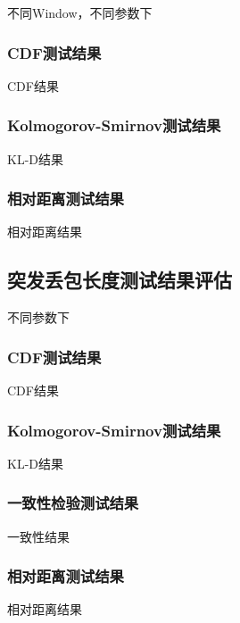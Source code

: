 不同Window，不同参数下

\subsubsection{CDF测试结果}
\label{chap:analyze:result:window:cdf}

CDF结果

\subsubsection{Kolmogorov-Smirnov测试结果}
\label{chap:analyze:result:window:kld}

KL-D结果

\subsubsection{相对距离测试结果}
\label{chap:analyze:result:window:distance}

相对距离结果

\subsection{突发丢包长度测试结果评估}
\label{chap:analyze:result:burst}

不同参数下

\subsubsection{CDF测试结果}
\label{chap:analyze:result:burst:cdf}

CDF结果

\subsubsection{Kolmogorov-Smirnov测试结果}
\label{chap:analyze:result:burst:kld}

KL-D结果

\subsubsection{一致性检验测试结果}
\label{chap:analyze:result:burst:statistical}

一致性结果

\subsubsection{相对距离测试结果}
\label{chap:analyze:result:burst:distance}

相对距离结果
